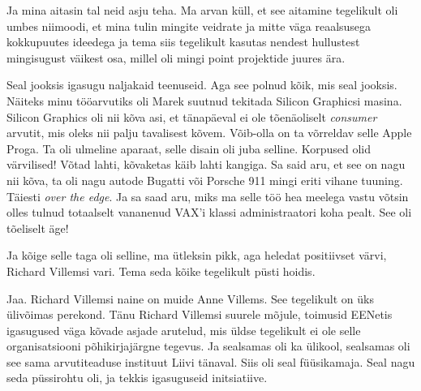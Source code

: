 Ja mina aitasin tal neid asju teha. Ma arvan küll, et see aitamine tegelikult 
oli  umbes niimoodi, et mina tulin mingite veidrate ja mitte väga reaalsusega 
kokkupuutes ideedega ja tema siis tegelikult kasutas nendest hullustest 
mingisugust  väikest osa, millel oli mingi point projektide juures ära.


Seal jooksis igasugu naljakaid teenuseid. Aga see polnud kõik, mis seal 
jooksis. Näiteks minu tööarvutiks oli Marek suutnud tekitada  Silicon 
Graphicsi masina. Silicon Graphics oli nii kõva asi, et tänapäeval 
ei ole tõenäoliselt \emph{consumer} arvutit, mis oleks nii palju tavalisest 
kõvem. Võib-olla on ta võrreldav selle Apple Proga. Ta oli ulmeline aparaat, 
selle disain oli juba selline. Korpused olid värvilised! Võtad lahti, kõvaketas 
käib lahti kangiga. Sa said aru, et see on nagu nii kõva, ta oli nagu autode 
Bugatti või Porsche 911  mingi eriti vihane tuuning. Täiesti \emph{over the 
edge}. Ja sa saad aru, miks ma selle töö hea meelega vastu võtsin olles tulnud  
totaalselt vananenud VAX'i klassi administraatori koha pealt. See oli tõeliselt 
äge!

Ja kõige selle taga oli selline, ma ütleksin  pikk, aga  heledat positiivset 
värvi, Richard Villemsi vari. Tema seda kõike 
tegelikult püsti hoidis.


Jaa. Richard Villemsi naine on muide Anne Villems. 
See tegelikult on  üks ülivõimas perekond. Tänu Richard Villemsi suurele 
mõjule, toimusid EENetis igasugused väga  kõvade asjade arutelud, 
mis üldse tegelikult ei ole selle organisatsiooni põhikirjajärgne tegevus. Ja 
sealsamas oli ka ülikool,  sealsamas oli see sama arvutiteaduse 
instituut  
Liivi tänaval. Siis oli seal füüsikamaja. Seal nagu seda püssirohtu oli, ja 
tekkis  igasuguseid initsiatiive.

